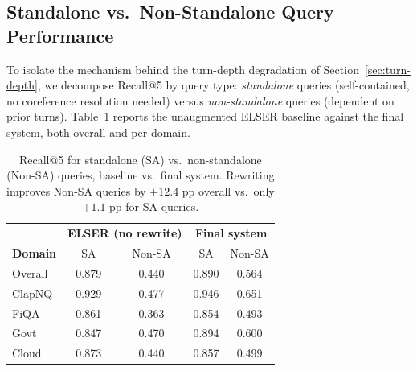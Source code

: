 \subsection{Standalone vs.\ Non-Standalone Query Performance}
\label{sec:standalone-nonstandalone}

To isolate the mechanism behind the turn-depth degradation of Section~\ref{sec:turn-depth}, we
decompose Recall@5 by query type: \emph{standalone} queries (self-contained, no coreference
resolution needed) versus \emph{non-standalone} queries (dependent on prior turns).
Table~\ref{tab:standalone-nonstandalone} reports the unaugmented ELSER baseline against the final
system, both overall and per domain.

\begin{table}[h]
\centering
\begin{tabular}{lcccc}
\toprule
& \multicolumn{2}{c}{\textbf{ELSER (no rewrite)}} & \multicolumn{2}{c}{\textbf{Final system}} \\
\textbf{Domain} & SA & Non-SA & SA & Non-SA \\
\midrule
Overall & 0.879 & 0.440 & 0.890 & 0.564 \\
ClapNQ  & 0.929 & 0.477 & 0.946 & 0.651 \\
FiQA    & 0.861 & 0.363 & 0.854 & 0.493 \\
Govt    & 0.847 & 0.470 & 0.894 & 0.600 \\
Cloud   & 0.873 & 0.440 & 0.857 & 0.499 \\
\bottomrule
\end{tabular}
\caption{Recall@5 for standalone (SA) vs.\ non-standalone (Non-SA) queries, baseline vs.\ final
system. Rewriting improves Non-SA queries by $+12.4$ pp overall vs.\ only $+1.1$ pp for SA queries.}
\label{tab:standalone-nonstandalone}
\end{table}

